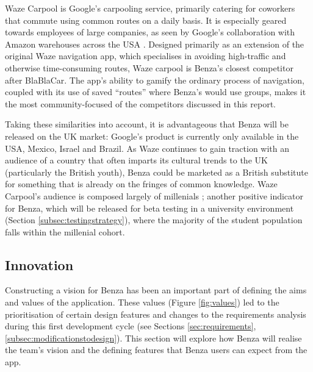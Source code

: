 \documentclass{article}
\begin{document}
    Waze Carpool is Google's carpooling service, primarily catering for coworkers that commute using common routes on a daily basis. It is especially geared towards employees of large companies, as seen by Google's collaboration with Amazon warehouses across the USA \cite{wazeTargetsAmazonWarehouses}. Designed primarily as an extension of the original Waze navigation \gls{app}, which specialises in avoiding high-traffic and otherwise time-consuming routes, Waze carpool is Benza's closest competitor after BlaBlaCar. The \gls{app}'s ability to \gls{gamify} the ordinary process of navigation, coupled with its use of saved ``routes'' where Benza's would use groups, makes it the most community-focused of the competitors discussed in this report. \par
    
    Taking these similarities into account, it is advantageous that Benza will be released on the UK market: Google's product is currently only available in the USA, Mexico, Israel and Brazil. As Waze continues to gain traction with an audience of a country that often imparts its cultural trends to the UK (particularly the British youth), Benza could be marketed as a British substitute for something that is already on the fringes of common knowledge. Waze Carpool's audience is composed largely of millenials \cite{wazetargetsmillenials}; another positive indicator for Benza, which will be released for beta testing in a university environment (Section \ref{subsec:testingstrategy}), where the majority of the student population falls within the millenial cohort.
    
    \subsection{Innovation}
    \label{subsec:innovation}
    Constructing a vision for Benza has been an important part of defining the aims and values of the application. These values (Figure \ref{fig:values}) led to the prioritisation of certain design features and changes to the requirements analysis during this first development cycle (see Sections \ref{sec:requirements}, \ref{subsec:modificationstodesign}). This section will explore how Benza will realise the team's vision and the defining features that Benza users can expect from the \gls{app}. \par
    
\end{document}
